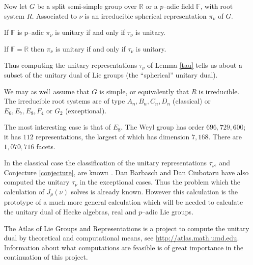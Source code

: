 Now let $G$ be a split semi-simple group over $\mathbb R$ or a $p$--adic
field $\mathbb F$, with root system
$R$.  Associated to $\nu$ is an irreducible spherical representation
$\pi_\nu$ of $G$.

\begin{lemma}
\label{padic}
If $\mathbb F$ is p--adic $\pi_\nu$ is unitary if and only if $\tau_\nu$ is unitary.
\end{lemma}

\begin{conjecture}
\label{conjecture}
If $\mathbb F=\mathbb R$ then $\pi_\nu$ is unitary if and only if
$\tau_\nu$ is unitary.
\end{conjecture}

Thus computing the unitary representations $\tau_\nu$ of Lemma
\ref{tau} tells us about a subset of the unitary dual of Lie groups
(the ``spherical'' unitary dual).

We may as well assume that $G$ is simple, or equivalently that $R$ is
irreducible. The irreducible root systems are of type
$A_n,B_n,C_n,D_n$ (classical) or $E_6,E_7,E_8, F_4$
or $G_2$ (exceptional).

The most interesting case is that of $E_8$.  The Weyl group has order
$696,729,600$; it has $112$ representations, the largest of which
has dimension $7,168$.  There are $1,070,716$ facets.

In the classical case the classification of the unitary
representations $\tau_\nu$, and Conjecture \ref{conjecture},
are known \cite{barbasch_spherical}.
Dan Barbasch and Dan Ciubotaru have also computed the unitary
$\tau_\nu$ in the exceptional cases.
Thus the problem which the calculation of $J_\rho(\nu)$ solves is
already known. However this calculation is the prototype of a much
more general calculation which will be needed to calculate the unitary
dual of Hecke algebras, real and $p$--adic Lie groups.

The Atlas of Lie Groups and Representations 
is a project to compute  the unitary dual by theoretical and computational
means, see \url{http://atlas.math.umd.edu}. 
Information about what computations are feasible is of
great importance in the continuation of this project.




